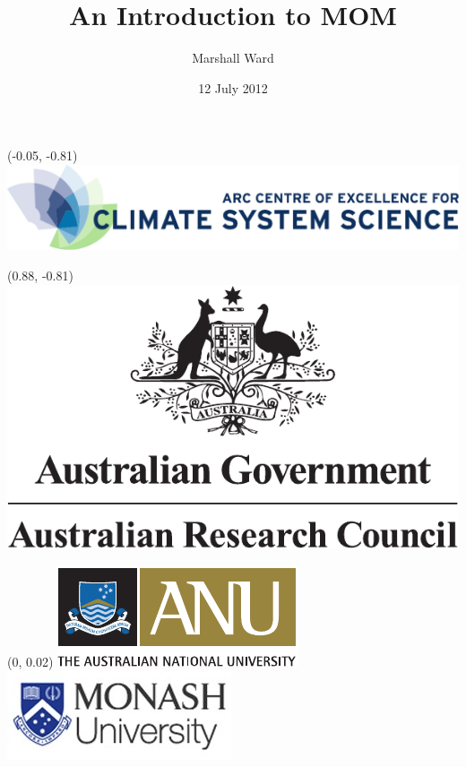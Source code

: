 \documentclass[red]{beamer}
\title{An Introduction to MOM}
\author{Marshall Ward}
\institute{Australian National University\\Research School of Earth Sciences}
\date{12 July 2012}
\begin{document}
\begin{frame}
    \titlepage
    \begin{textblock*}{0.5\textwidth}(-0.05\textwidth, -0.81\textheight)
        \includegraphics[width=\textwidth]{coecms_logo.pdf}
    \end{textblock*}
    \begin{textblock*}{0.15\textwidth}(0.88\textwidth, -0.81\textheight)
        \includegraphics[width=\textwidth]{arc_logo.pdf}
    \end{textblock*}
    \begin{textblock*}{\textwidth}(0\textwidth, 0.02\textheight)
        \includegraphics[height=0.063\textheight]{anu_logo.pdf}
        \hspace{0.02\textwidth}
        \includegraphics[height=0.063\textheight]{monash_logo.png}
        \hspace{0.02\textwidth}

\end{textblock*}
\end{frame}
\end{document}
